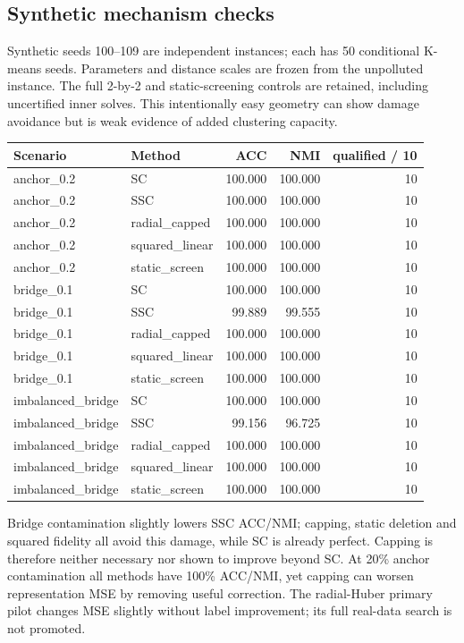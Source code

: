 \subsection{Synthetic mechanism checks}
Synthetic seeds 100--109 are independent instances; each has 50 conditional K-means seeds. Parameters and distance scales are frozen from the unpolluted instance. The full 2-by-2 and static-screening controls are retained, including uncertified inner solves. This intentionally easy geometry can show damage avoidance but is weak evidence of added clustering capacity.
\begin{center}\small\begin{tabular}{llrrr}\toprule Scenario & Method & ACC & NMI & qualified / 10 \\\midrule
anchor\_0.2 & SC & 100.000 & 100.000 & 10 \\
anchor\_0.2 & SSC & 100.000 & 100.000 & 10 \\
anchor\_0.2 & radial\_capped & 100.000 & 100.000 & 10 \\
anchor\_0.2 & squared\_linear & 100.000 & 100.000 & 10 \\
anchor\_0.2 & static\_screen & 100.000 & 100.000 & 10 \\
bridge\_0.1 & SC & 100.000 & 100.000 & 10 \\
bridge\_0.1 & SSC & 99.889 & 99.555 & 10 \\
bridge\_0.1 & radial\_capped & 100.000 & 100.000 & 10 \\
bridge\_0.1 & squared\_linear & 100.000 & 100.000 & 10 \\
bridge\_0.1 & static\_screen & 100.000 & 100.000 & 10 \\
imbalanced\_bridge & SC & 100.000 & 100.000 & 10 \\
imbalanced\_bridge & SSC & 99.156 & 96.725 & 10 \\
imbalanced\_bridge & radial\_capped & 100.000 & 100.000 & 10 \\
imbalanced\_bridge & squared\_linear & 100.000 & 100.000 & 10 \\
imbalanced\_bridge & static\_screen & 100.000 & 100.000 & 10 \\
\bottomrule\end{tabular}\end{center}
Bridge contamination slightly lowers SSC ACC/NMI; capping, static deletion and squared fidelity all avoid this damage, while SC is already perfect. Capping is therefore neither necessary nor shown to improve beyond SC. At 20\% anchor contamination all methods have 100\% ACC/NMI, yet capping can worsen representation MSE by removing useful correction. The radial-Huber primary pilot changes MSE slightly without label improvement; its full real-data search is not promoted.
